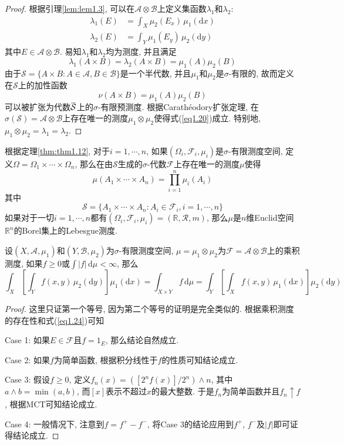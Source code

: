 \documentclass[cn, 12pt, math=mtpro2, bibstyle=apa, blue, twocol]{elegantbook}
\newcommand{\F}{\mathcal{F}}
\newcommand{\R}{\mathbb{R}}
\newcommand{\SE}{\mathcal{S}}
\newcommand{\overbar}[1]{\mkern 1.5mu\overline{\mkern-1.5mu#1\mkern-1.5mu}\mkern 1.5mu}
\begin{document}
\begin{proof}
  根据引理\ref{lem:lem1.3}, 可以在$\mathcal{A}\otimes\mathcal{B}$上定义集函数$\lambda_1$和$\lambda_2$:
  \begin{align}
  \lambda_1(E)&=\int_X\mu_2(E_x)\,\mu_1(\text{d}x) \label{eq1.24} \\
  \lambda_2(E)&=\int_Y\mu_1(E_y)\,\mu_2(\text{d}y)
  \end{align}
  其中$E\in\mathcal{A}\otimes\mathcal{B}$. 易知$\lambda_1$和$\lambda_2$均为测度, 并且满足
  $$\lambda_1(A\times B)=\lambda_2(A\times B)=\mu_1(A)\mu_2(B)$$
  由于$\SE=\{A\times B: A\in\mathcal{A}, B\in\mathcal{B}\}$是一个半代数, 并且$\mu_1$和$\mu_2$是$\sigma$-有限的, 故而定义在$\SE$上的加性函数
  $$\nu(A\times B)=\mu_1(A)\mu_2(B)$$
  可以被扩张为代数$\overbar{\SE}$上的$\sigma$-有限预测度. 根据Carathéodory扩张定理, 在$\sigma(\SE)=\mathcal{A}\otimes\mathcal{B}$上存在唯一的测度$\mu_1\otimes\mu_2$使得式(\ref{eq1.20})成立. 特别地, $\mu_1\otimes\mu_2=\lambda_1=\lambda_2$.
\end{proof}
根据定理\ref{thm:thm1.12}, 对于$i=1,\cdots,n$, 如果$(\Omega_i,\F_i,\mu_i)$是$\sigma$-有限测度空间, 定义$\Omega=\Omega_1\times\cdots\times\Omega_n$, 那么在由$\SE$生成的$\sigma$-代数$\F$上存在唯一的测度$\mu$使得
\begin{equation}\label{eq1.21}
  \mu(A_1\times\cdots\times A_n)=\prod_{i=1}^{n}\mu_i(A_i)
\end{equation}
其中
$$\SE=\{A_1\times\cdots\times A_n: A_i\in\F_i, i=1,\cdots,n\}$$
如果对于一切$i=1,\cdots,n$都有$(\Omega_i,\F_i,\mu_i)=(\R,\mathcal{R},m)$, 那么$\mu$是$n$维Euclid空间$\R^n$的Borel集上的Lebesgue测度.

\begin{theorem}[Fubini定理]
  设$(X,\mathcal{A},\mu_1)$和$(Y,\mathcal{B},\mu_2)$为$\sigma$-有限测度空间, $\mu=\mu_1\otimes\mu_2$为$\mathcal{F}=\mathcal{A}\otimes\mathcal{B}$上的乘积测度, 如果$f\geq0$或$\int|f|\,\text{d}\mu<\infty$, 那么
  $$\int_X\left[\int_Yf(x,y)\,\mu_2(\text{d}y)\right]\mu_1(\text{d}x)=\int_{X\times Y}f\,\text{d}\mu=\int_Y\left[\int_Xf(x,y)\,\mu_1(\text{d}x)\right]\mu_2(\text{d}y)$$
\end{theorem}
\begin{proof}
  这里只证第一个等号, 因为第二个等号的证明是完全类似的. 根据乘积测度的存在性和式(\ref{eq1.24})可知

  Case 1: 如果$E\in\mathcal{F}$且$f=1_E$, 那么结论自然成立.

  Case 2: 如果$f$为简单函数, 根据积分线性于$f$的性质可知结论成立.

  Case 3: 假设$f\geq0$, 定义$f_n(x)=([2^nf(x)]/2^n)\wedge n$, 其中$a\wedge b=\min(a,b)$, 而$[x]$表示不超过$x$的最大整数. 于是$f_n$为简单函数并且$f_n\uparrow f$, 根据MCT可知结论成立.

  Case 4: 一般情况下, 注意到$f=f^+-f^-$, 将Case 3的结论应用到$f^+$, $f^-$及$|f|$即可证得结论成立.
\end{proof}
\end{document}
